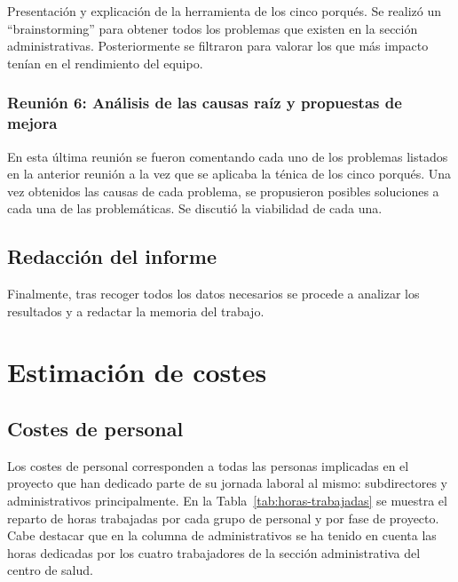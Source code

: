 Presentación y explicación de la herramienta de los cinco porqués.
Se realizó un ``brainstorming'' para obtener todos los problemas que existen en la sección administrativas.
Posteriormente se filtraron para valorar los que más impacto tenían en el rendimiento del equipo.

\subsubsection{Reunión 6: Análisis de las causas raíz y propuestas de mejora}

En esta última reunión se fueron comentando cada uno de los problemas listados en la anterior reunión a la vez que se aplicaba la ténica de los cinco porqués.
Una vez obtenidos las causas de cada problema, se propusieron posibles soluciones a cada una de las problemáticas. Se discutió la viabilidad de cada una.

\subsection{Redacción del informe}

Finalmente, tras recoger todos los datos necesarios se procede a analizar los resultados y a redactar la memoria del trabajo.

\section{Estimación de costes}


\subsection{Costes de personal}

Los costes de personal corresponden a todas las personas implicadas en el proyecto que han dedicado parte de su jornada laboral al mismo: subdirectores y administrativos principalmente.
En la Tabla~\ref{tab:horas-trabajadas} se muestra el reparto de horas trabajadas por cada grupo de personal y por fase de proyecto.
Cabe destacar que en la columna de administrativos se ha tenido en cuenta las horas dedicadas por los cuatro trabajadores de la sección administrativa del centro de salud.

